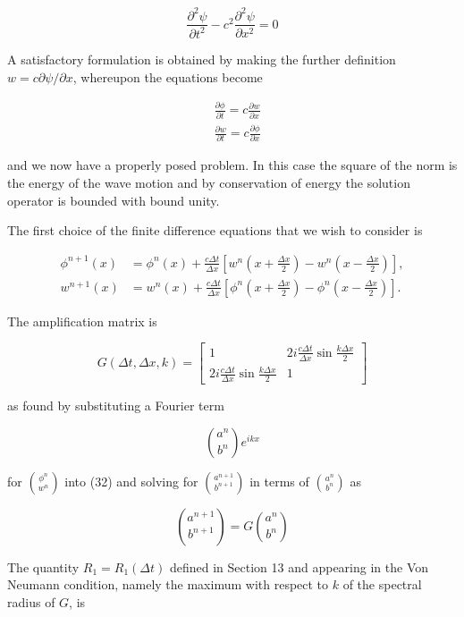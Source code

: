 \documentclass[10pt]{article}
\begin{document}
\[
\frac{\partial^{2} \psi}{\partial t^{2}}-c^{2} \frac{\partial^{2} \psi}{\partial x^{2}}=0
\]

A satisfactory formulation is obtained by making the further definition\\
\(w=c \partial \psi / \partial x\), whereupon the equations become

\[
\begin{aligned}
& \frac{\partial \phi}{\partial t}=c \frac{\partial w}{\partial x} \\
& \frac{\partial w}{\partial t}=c \frac{\partial \phi}{\partial x}
\end{aligned}
\]

and we now have a properly posed problem. In this case the square of the norm is the energy of the wave motion and by conservation of energy the solution operator is bounded with bound unity.

The first choice of the finite difference equations that we wish to consider is

\[
\begin{aligned}
\phi^{n+1}(x) & =\phi^{n}(x)+\frac{c \Delta t}{\Delta x}\left[w^{n}\left(x+\frac{\Delta x}{2}\right)-w^{n}\left(x-\frac{\Delta x}{2}\right)\right], \\
w^{n+1}(x) & =w^{n}(x)+\frac{c \Delta t}{\Delta x}\left[\phi^{n}\left(x+\frac{\Delta x}{2}\right)-\phi^{n}\left(x-\frac{\Delta x}{2}\right)\right] .
\end{aligned}
\]

The amplification matrix is

\[
G(\Delta t, \Delta x, k)=\left[\begin{array}{lc}
1 & 2 i \frac{c \Delta t}{\Delta x} \sin \frac{k \Delta x}{2} \\
2 i \frac{c \Delta t}{\Delta x} \sin \frac{k \Delta x}{2} & 1
\end{array}\right]
\]

as found by substituting a Fourier term

\[
\binom{a^{n}}{b^{n}} e^{i k x}
\]

for \(\binom{\phi^{n}}{w^{n}}\) into (32) and solving for \(\binom{a^{n+1}}{b^{n+1}}\) in terms of \(\binom{a^{n}}{b^{n}}\) as

\[
\binom{a^{n+1}}{b^{n+1}}=G\binom{a^{n}}{b^{n}}
\]

The quantity \(R_{1}=R_{1}(\Delta t)\) defined in Section 13 and appearing in the Von Neumann condition, namely the maximum with respect to \(k\) of the spectral radius of \(G\), is
\end{document}
